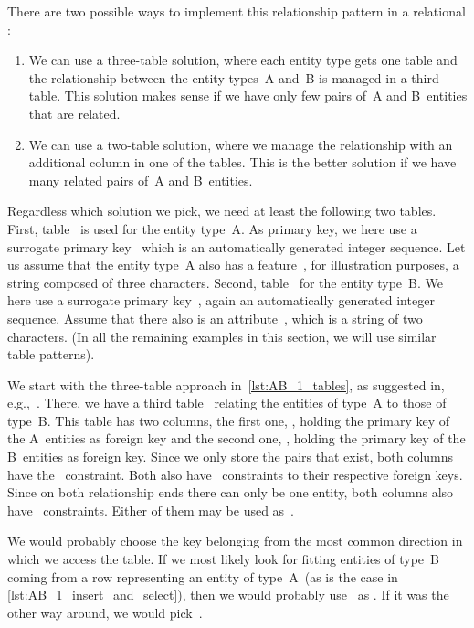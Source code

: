 There are two possible ways to implement this relationship pattern in a relational \dbms:%
%
\begin{enumerate}%
%
\item We can use a three-table solution, where each entity type gets one table and the relationship between the entity types~A and~B is managed in a third table.
This solution makes sense if we have only few pairs of~A and B~entities that are related.%
%
\item We can use a two-table solution, where we manage the relationship with an additional column in one of the tables.
This is the better solution if we have many related pairs of~A and B~entities.%
%
\end{enumerate}%
%
Regardless which solution we pick, we need at least the following two tables.
First, table~ is used for the entity type~A.
As primary key, we here use a surrogate primary key~ which is an automatically generated integer sequence.
Let us assume that the entity type~A also has a feature~, for illustration purposes, a string composed of three characters.
Second, table~ for the entity type~B.
We here use a surrogate primary key~, again an automatically generated integer sequence.
Assume that there also is an attribute~, which is a string of two characters.
(In all the remaining examples in this section, we will use similar table patterns).

We start with the three-table approach in~\cref{lst:AB_1_tables}, as suggested in, e.g.,~\cite{S2024D:MEDTRDM}.
There, we have a third table~ relating the entities of type~A to those of type~B.
This table has two columns, the first one, , holding the primary key of the A~entities as foreign key and the second one, , holding the primary key of the B~entities as foreign key.
Since we only store the pairs that exist, both columns have the~ constraint.
Both also have~ constraints to their respective foreign keys.
Since on both relationship ends there can only be one entity, both columns also have ~constraints.
Either of them may be used as~.

We would probably choose the key belonging from the most common direction in which we access the table.
If we most likely look for fitting entities of type~B coming from a row representing an entity of type~A~(as is the case in \cref{lst:AB_1_insert_and_select}), then we would probably use~ as .
If it was the other way around, we would pick~.

